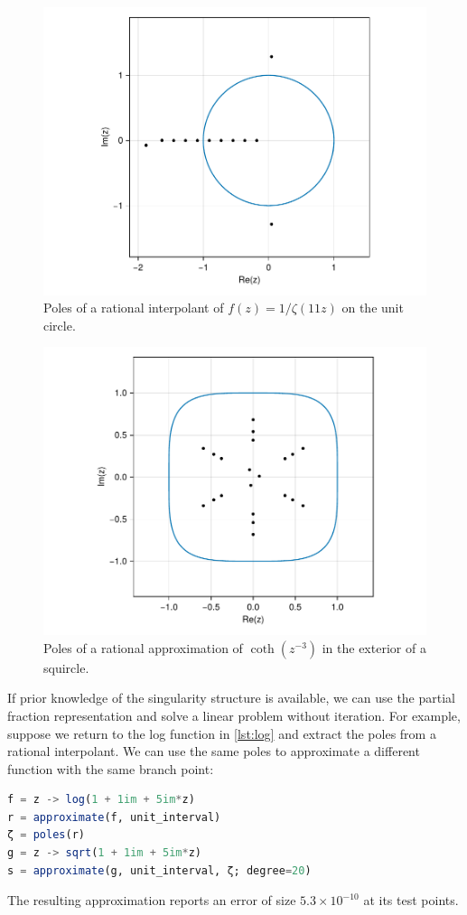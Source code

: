 \documentclass{juliacon}
\begin{document}
\begin{figure}
\centering
\includegraphics[width=\columnwidth]{zetapoles.pdf}
\caption{Poles of a rational interpolant of $f(z) = 1/\zeta(11z)$ on the unit circle.}
\label{fig:zetapoles}
\end{figure}

\begin{figure}
\centering
\includegraphics[width=\columnwidth]{squircle.pdf}
\caption{Poles of a rational approximation of $\coth(z^{-3})$ in the exterior of a squircle.}
\label{fig:squircle}
\end{figure}

If prior knowledge of the singularity structure is available, we can use the partial fraction representation and solve a linear problem without iteration. For example, suppose we return to the log function in \autoref{lst:log} and extract the poles from a rational interpolant. We can use the same poles to approximate a different function with the same branch point:
\begin{lstlisting}[language = Julia, caption={Partial fraction approximation of $\log(1 + i + 5iz)$.}]
f = z -> log(1 + 1im + 5im*z)
r = approximate(f, unit_interval)
ζ = poles(r)
g = z -> sqrt(1 + 1im + 5im*z)
s = approximate(g, unit_interval, ζ; degree=20)
\end{lstlisting}
The resulting approximation reports an error of size $5.3\times{10}^{-10}$ at its test points. 
\end{document}
